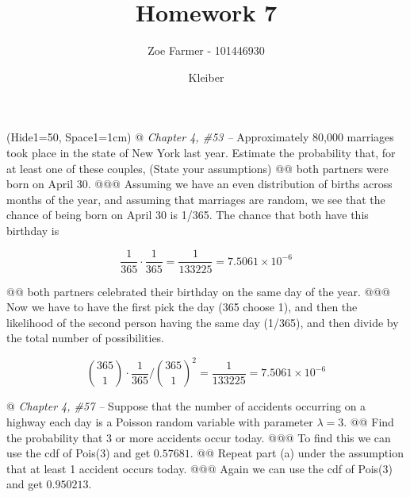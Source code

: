 \documentclass[10pt]{article}
\title{Homework 7}
\date{Kleiber}
\author{Zoe Farmer - 101446930}
\begin{document}
\maketitle

\begin{table}[!ht]
    \centering
\end{table}

\begin{easylist}[enumerate]
    \ListProperties(Hide1=50, Space1=1cm)
    @ \textit{Chapter 4, \#53 --} Approximately 80,000 marriages took place in the state of New York last year. Estimate
    the probability that, for at least one of these couples, (State your assumptions)
    @@ both partners were born on April 30.
    @@@ Assuming we have an even distribution of births across months of the year, and assuming that marriages are
    random, we see that the chance of being born on April 30 is 1/365. The chance that both have this birthday is

    \[
        \frac{1}{365} \cdot \frac{1}{365} = \frac{1}{133225} = \boxed{7.5061 \times 10^{-6} }
    \]

    @@ both partners celebrated their birthday on the same day of the year.
    @@@ Now we have to have the first pick the day (365 choose 1), and then the likelihood of the second person having
    the same day (1/365), and then divide by the total number of possibilities.

    \[ \binom{365}{1} \cdot \frac{1}{365} \Big / \binom{365}{1}^2 = \frac{1}{133225} = \boxed{7.5061 \times 10^{-6} } \]

    @ \textit{Chapter 4, \#57 --} Suppose that the number of accidents occurring on a highway each day is a Poisson
    random variable with parameter $\lambda = 3$.
    @@ Find the probability that 3 or more accidents occur today.
    @@@ To find this we can use the cdf of Pois(3) and get $\boxed{0.57681}$.
    @@ Repeat part (a) under the assumption that at least 1 accident occurs today.
    @@@ Again we can use the cdf of Pois(3) and get $\boxed{0.950213}$.


\end{easylist}
\end{document}
